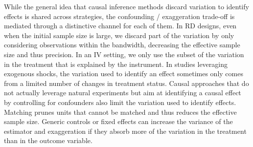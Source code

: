 			
			While the general idea that causal inference methods discard variation to identify effects is shared across strategies, the confounding / exaggeration trade-off is mediated through a distinctive channel for each of them. In RD designs, even when the initial sample size is large, we discard part of the variation by only considering observations within the bandwidth, decreasing the effective sample size and thus precision. In an IV setting, we only use the subset of the variation in the treatment that is explained by the instrument. In studies leveraging exogenous shocks, the variation used to identify an effect sometimes only comes from a limited number of changes in treatment status. Causal approaches that do not actually leverage natural experiments but aim at identifying a causal effect by controlling for confounders also limit the variation used to identify effects. 
			Matching prunes units that cannot be matched and thus reduces the effective sample size. Generic controls or fixed effects can increase the variance of the estimator and exaggeration if they absorb more of the variation in the treatment than in the outcome variable. 
			
